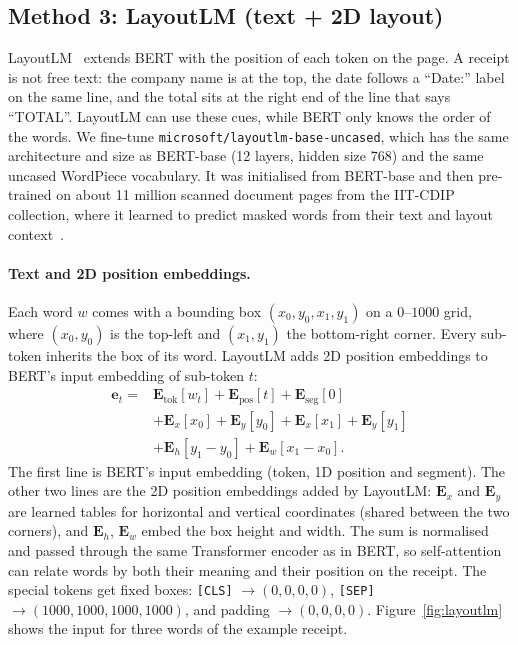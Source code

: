 
\subsection{Method 3: LayoutLM (text + 2D layout)}
\label{sec:layoutlm}

LayoutLM~\cite{xu2020layoutlm} extends BERT with the position of each token on the page. A receipt is not free text: the company name is at the top, the date follows a ``Date:'' label on the same line, and the total sits at the right end of the line that says ``TOTAL''. LayoutLM can use these cues, while BERT only knows the order of the words. We fine-tune \texttt{microsoft/layoutlm-base-uncased}, which has the same architecture and size as BERT-base (12 layers, hidden size 768) and the same uncased WordPiece vocabulary. It was initialised from BERT-base and then pre-trained on about 11 million scanned document pages from the IIT-CDIP collection, where it learned to predict masked words from their text and layout context~\cite{xu2020layoutlm}.

\paragraph{Text and 2D position embeddings.}
Each word $w$ comes with a bounding box $(x_0, y_0, x_1, y_1)$ on a $0$--$1000$ grid, where $(x_0, y_0)$ is the top-left and $(x_1, y_1)$ the bottom-right corner. Every sub-token inherits the box of its word. LayoutLM adds 2D position embeddings to BERT's input embedding of sub-token $t$:
\begin{equation}
\begin{aligned}
  \mathbf{e}_t ={}& \mathbf{E}_{\text{tok}}[w_t] + \mathbf{E}_{\text{pos}}[t] + \mathbf{E}_{\text{seg}}[0] \\
  &+ \mathbf{E}_{x}[x_0] + \mathbf{E}_{y}[y_0] + \mathbf{E}_{x}[x_1] + \mathbf{E}_{y}[y_1] \\
  &+ \mathbf{E}_{h}[y_1 - y_0] + \mathbf{E}_{w}[x_1 - x_0].
\end{aligned}
\end{equation}
The first line is BERT's input embedding (token, 1D position and segment). The other two lines are the 2D position embeddings added by LayoutLM: $\mathbf{E}_{x}$ and $\mathbf{E}_{y}$ are learned tables for horizontal and vertical coordinates (shared between the two corners), and $\mathbf{E}_{h}$, $\mathbf{E}_{w}$ embed the box height and width. The sum is normalised and passed through the same Transformer encoder as in BERT, so self-attention can relate words by both their meaning and their position on the receipt. The special tokens get fixed boxes: \texttt{[CLS]} $\rightarrow (0,0,0,0)$, \texttt{[SEP]} $\rightarrow (1000,1000,1000,1000)$, and padding $\rightarrow (0,0,0,0)$. Figure~\ref{fig:layoutlm} shows the input for three words of the example receipt.

